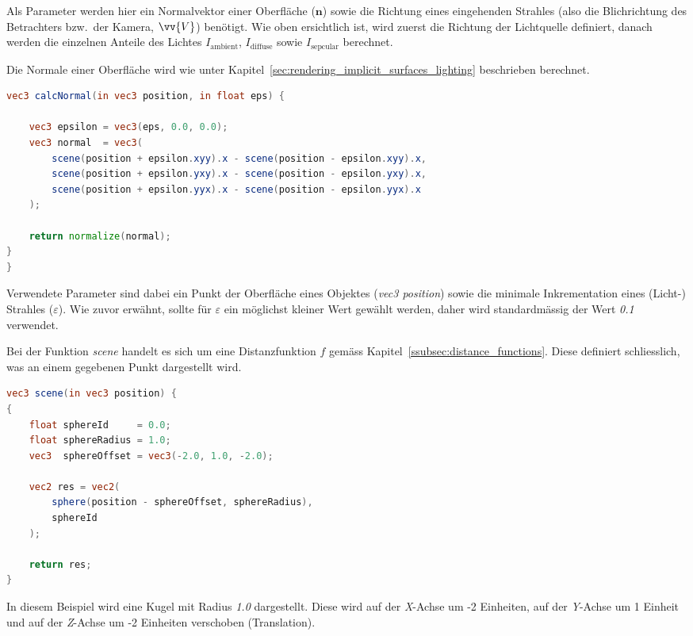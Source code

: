 Als Parameter werden hier ein Normalvektor einer Oberfläche ($\bm{n}$)
sowie die Richtung eines eingehenden Strahles (also die Blichrichtung
des Betrachters bzw.\ der Kamera, $\vv{V}$) benötigt.
Wie oben ersichtlich ist, wird zuerst die Richtung der Lichtquelle definiert,
danach werden die einzelnen Anteile des Lichtes $I_{\text{ambient}}$,
$I_{\text{diffuse}}$ sowie $I_{\text{sepcular}}$ berechnet.

Die Normale einer Oberfläche wird wie unter
Kapitel~\ref{sec:rendering_implicit_surfaces_lighting} beschrieben
berechnet.

\begin{lstlisting}[language=GLSL,caption={Berechnung der Normalen einer
        impliziten Oberfläche in
        GLSL.},label={alg:glsl_normal},captionpos=b,emph={calcNormal}]
vec3 calcNormal(in vec3 position, in float eps) {

    vec3 epsilon = vec3(eps, 0.0, 0.0);
    vec3 normal  = vec3(
        scene(position + epsilon.xyy).x - scene(position - epsilon.xyy).x,
        scene(position + epsilon.yxy).x - scene(position - epsilon.yxy).x,
        scene(position + epsilon.yyx).x - scene(position - epsilon.yyx).x
    );

    return normalize(normal);
}
}
\end{lstlisting}

Verwendete Parameter sind dabei ein Punkt der Oberfläche eines Objektes
(\textit{vec3 position}) sowie die minimale Inkrementation eines
(Licht-) Strahles ($\varepsilon$). Wie zuvor erwähnt, sollte
für $\varepsilon$ ein möglichst kleiner Wert gewählt werden, daher wird
standardmässig der Wert \textit{0.1} verwendet.

Bei der Funktion \textit{scene} handelt es sich um eine Distanzfunktion
$f$ gemäss Kapitel~\ref{ssubsec:distance_functions}. Diese definiert
schliesslich, was an einem gegebenen Punkt dargestellt wird.

\begin{lstlisting}[language=GLSL,caption={Distanzfunktion $f$ in
        GLSL.},label={alg:glsl_distance_func},captionpos=b,emph={scene}]
vec3 scene(in vec3 position) {
{
    float sphereId     = 0.0;
    float sphereRadius = 1.0;
    vec3  sphereOffset = vec3(-2.0, 1.0, -2.0);

    vec2 res = vec2(
        sphere(position - sphereOffset, sphereRadius),
        sphereId
    );

    return res;
}
\end{lstlisting}

In diesem Beispiel wird eine Kugel mit Radius \textit{1.0} dargestellt.
Diese wird auf der \textit{X}-Achse um -2 Einheiten, auf der
\textit{Y}-Achse um 1 Einheit und auf der \textit{Z}-Achse um -2
Einheiten verschoben (Translation).
